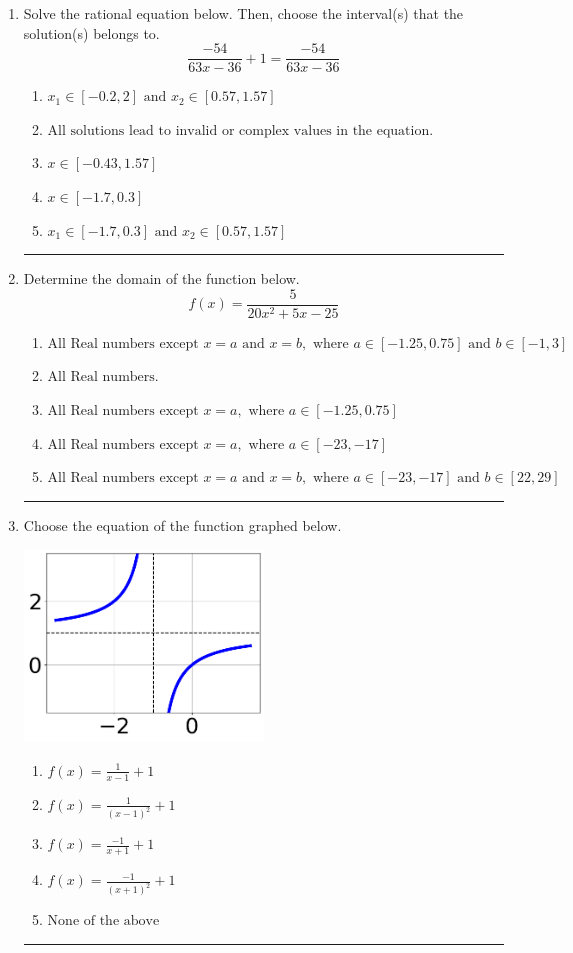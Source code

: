 \documentclass[14pt]{extbook}
\newcommand{\litem}[1]{\item#1\hspace*{-1cm}\rule{\textwidth}{0.4pt}}
\begin{document}
\begin{enumerate}
{\begin{enumerate}[label=\Alph*.]
\end{enumerate} }
\litem{
Solve the rational equation below. Then, choose the interval(s) that the solution(s) belongs to.\[ \frac{-54}{63x -36} + 1 = \frac{-54}{63x -36} \]\begin{enumerate}[label=\Alph*.]
\item \( x_1 \in [-0.2, 2] \text{ and } x_2 \in [0.57,1.57] \)
\item \( \text{All solutions lead to invalid or complex values in the equation.} \)
\item \( x \in [-0.43,1.57] \)
\item \( x \in [-1.7,0.3] \)
\item \( x_1 \in [-1.7, 0.3] \text{ and } x_2 \in [0.57,1.57] \)

\end{enumerate} }
\litem{
Determine the domain of the function below.\[ f(x) = \frac{5}{20x^{2} +5 x -25} \]\begin{enumerate}[label=\Alph*.]
\item \( \text{All Real numbers except } x = a \text{ and } x = b, \text{ where } a \in [-1.25, 0.75] \text{ and } b \in [-1, 3] \)
\item \( \text{All Real numbers.} \)
\item \( \text{All Real numbers except } x = a, \text{ where } a \in [-1.25, 0.75] \)
\item \( \text{All Real numbers except } x = a, \text{ where } a \in [-23, -17] \)
\item \( \text{All Real numbers except } x = a \text{ and } x = b, \text{ where } a \in [-23, -17] \text{ and } b \in [22, 29] \)

\end{enumerate} }
\litem{
Choose the equation of the function graphed below.
\begin{center}
    \includegraphics[width=0.5\textwidth]{../Figures/rationalGraphToEquationCopyC.png}
\end{center}
\begin{enumerate}[label=\Alph*.]
\item \( f(x) = \frac{1}{x - 1} + 1 \)
\item \( f(x) = \frac{1}{(x - 1)^2} + 1 \)
\item \( f(x) = \frac{-1}{x + 1} + 1 \)
\item \( f(x) = \frac{-1}{(x + 1)^2} + 1 \)
\item \( \text{None of the above} \)


\end{enumerate}}
\end{enumerate}
\end{document}
